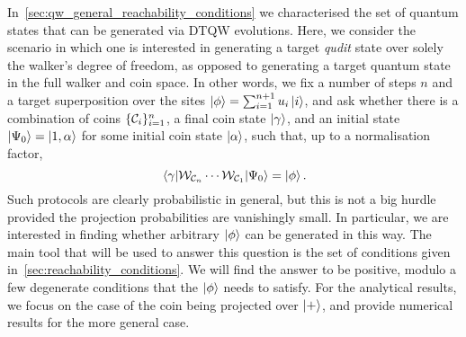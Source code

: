 In~\cref{sec:qw_general_reachability_conditions} we characterised the set of quantum states that can be generated via \ac{DTQW} evolutions.
Here, we consider the scenario in which one is interested in generating a target \emph{qudit} state over solely the walker's degree of freedom, as opposed to generating a target quantum state in the full walker and coin space.
In other words, we fix a number of steps $n$ and a target superposition over the sites $\ket\phi=\sum_{i=1}^{n+1} u_i\ket i$, and ask whether there is a combination of coins $\{{\mathcal{C}}_i\}_{i=1}^{n}$, a final coin state $\ket\gamma$, and an initial state $\ket{\Psi_0}=\ket{1, \alpha}$ for some initial coin state $\ket\alpha$, such that, up to a normalisation factor,
\begin{equation}
    \mel{\gamma}{{\mathcal{W}}_{{\mathcal{C}}_{n}} \cdots{\mathcal{W}}_{{\mathcal{C}}_{1}}}{\Psi_0} = \ket\phi.
\end{equation}
Such protocols are clearly probabilistic in general, but this is not a big hurdle provided the projection probabilities are vanishingly small.
In particular, we are interested in finding whether arbitrary $\ket\phi$ can be generated in this way.
The main tool that will be used to answer this question is the set of conditions given in~\cref{sec:reachability_conditions}.
We will find the answer to be positive, modulo a few degenerate conditions that the $\ket\phi$ needs to satisfy.
For the analytical results, we focus on the case of the coin being projected over $\ket+$,
and provide numerical results for the more general case.

